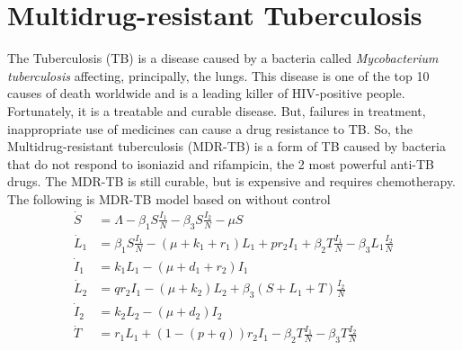 \section{Multidrug-resistant Tuberculosis} %

    The Tuberculosis (TB) is a disease caused by a bacteria called \textit{ Mycobacterium tuberculosis} affecting, principally, the lungs. This disease is one of the top 10 causes of death worldwide and is a leading killer of HIV-positive people. Fortunately, it is a treatable and curable disease. But, failures in treatment, inappropriate use of medicines can cause a drug resistance to TB. So, the Multidrug-resistant tuberculosis (MDR-TB) is a form of TB caused by bacteria that do not respond to isoniazid and rifampicin, the 2 most powerful anti-TB drugs. The MDR-TB is still curable, but is expensive and requires chemotherapy.
    The following is MDR-TB model based on \cite{Castillo-Chavez1997} without 
    control
    \begin{align*}
    	\dot{S}	&= 
        	\Lambda -\beta_{1} S \frac{I_1}{N} - \beta_{3}S\frac{I_2}{N} - 
            \mu S 
            \\
        \dot{L}_1 &= 
        	\beta_{1}S \frac{I_1}{N} - (\mu + k_1 + r_1)L_{1} + 
            pr_2 I_1 + \beta_{2} T \frac{I_1}{N} -
            \beta_{3} L_{1}\frac{I_2}{N}  
            \\
        \dot{I}_1 &=  
        	k_1 L_{1} - (\mu + d_1 + r_2)I_1  
            \\
        \dot{L}_2 &=  
        	q r_2 I_1 - (\mu + k_2)L_2 + \beta_{3}(S + L_1 + 
            T)\frac{I_2}{N}  
            \\
        \dot{I}_2 &=  
        	k_2 L_2 - (\mu + d_2)I_2  
            \\
        \dot{T} &=  
        	r_1 L_{1} + (1-(p+q))r_2 I_1 - \beta_{2} T \frac{I_1}{N} - 
            \beta_{3}T\frac{I_2}{N}  
    \end{align*}
    

